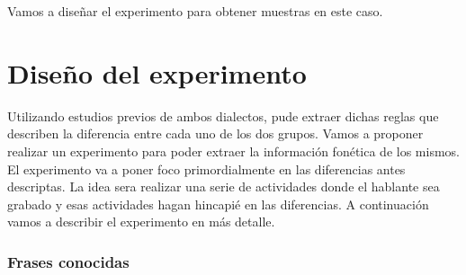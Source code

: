 \documentclass[11pt,a4paper,twoside]{tesis}
\begin{document}
Vamos a diseñar el experimento para obtener muestras en este caso.

\chapter{Diseño del experimento}


Utilizando estudios previos de ambos dialectos, pude extraer dichas reglas que describen la diferencia entre cada uno de los dos grupos. Vamos a proponer realizar un experimento para poder extraer la información fonética de los mismos. El experimento va a poner foco primordialmente en las diferencias antes descriptas. La idea sera realizar una serie de actividades donde el hablante sea grabado y esas actividades hagan hincapié en las diferencias. A continuación vamos a describir el experimento en más detalle.




\subsection{Frases conocidas}
\end{document}
